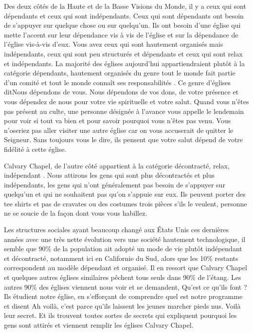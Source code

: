 Des deux côtés de la Haute et de la Basse Visions du Monde, il y a ceux qui sont dépendants et ceux qui sont
indépendants. Ceux qui sont dépendants ont besoin de s’appuyer sur quelque chose ou sur quelqu'un. Ils ont besoin
d’une église qui mette l’accent sur leur dépendance vis à vis de l’église et sur la dépendance de l’église vis-à-vis d’eux.
Vous avez ceux qui sont hautement organisés mais indépendants, ceux qui sont peu structurés et dépendants et ceux
qui sont relax et indépendants. La majorité des églises aujourd’hui appartiendraient plutôt à la catégorie \og dépendants,
hautement organisés \fg{} du genre \og tout le monde fait partie d’un comité \fg{} et \og tout le monde connaît ses responsabilités \fg{}.
Ce genre d’églises dit\frcolon\og Nous dépendons de vous.\fg{} Nous dépendons de vos dons, de votre présence et vous
dépendez de nous pour votre vie spirituelle et votre salut. Quand vous n’êtes pas présent au culte, une personne
désignée à l’avance vous appelle le lendemain pour voir si tout va bien et pour savoir pourquoi vous n’êtes pas venu.
Vous n’oseriez pas aller visiter une autre église car on vous accuserait de quitter le Seigneur. Sans toujours vous le
dire, ils pensent que votre salut dépend de votre fidélité à cette église.

Calvary Chapel, de l’autre côté appartient à la catégorie \og décontracté, relax, indépendant \fg{}. Nous attirons les gens qui
sont plus décontractés et plus indépendants, les gens qui n’ont généralement pas besoin de s’appuyer sur quelqu’un
et qui ne souhaitent pas qu’on s’appuie sur eux. Ils peuvent porter des tee shirts et pas de cravates ou des costumes
trois pièces s’ils le veulent, personne ne se soucie de la façon dont vous vous habillez.

Les structures sociales ayant beaucoup changé aux États Unis ces dernières années avec une très nette évolution vers
une société hautement technologique, il semble que 90\% de la population ait adopté un mode de vie plutôt
indépendant et décontracté, notamment ici en Californie du Sud, alors que les 10\% restants correspondent au modèle
dépendant et organisé. Il en ressort que Calvary Chapel et quelques autres églises similaires pêchent tous seuls dans
90\% de l'étang. Les autres 90\% des églises viennent nous voir et se demandent, \og Qu’est ce qu’ils font ?\fg{} Ils étudient
notre église, en s’efforçant de comprendre quel est notre programme et disent \og Ah voilà, c’est parce qu’ils laissent les
jeunes marcher pieds nus. Voilà leur secret. \fg{} Et ils trouvent toutes sortes de \og secrets\fg{} qui expliquent pourquoi les
gens sont attirés et viennent remplir les églises Calvary Chapel.


